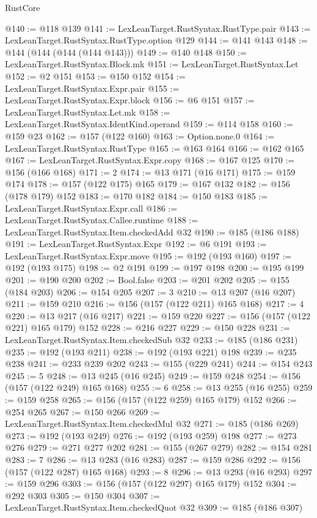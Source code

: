 \begin{lexlean}{RustCore}
\begin{coremodule}
{\begin{coremodule}
{{{{{@140 := @118 @139
@141 := LexLeanTarget.RustSyntax.RustType.pair
@143 := LexLeanTarget.RustSyntax.RustType.option @129
@144 := @141 @143
@148 := @144 (@144 (@144 (@144 @143)))
@149 := @140 @148
@150 := LexLeanTarget.RustSyntax.Block.mk
@151 := LexLeanTarget.RustSyntax.Let
@152 := @2 @151
@153 := @150 @152
@154 := LexLeanTarget.RustSyntax.Expr.pair
@155 := LexLeanTarget.RustSyntax.Expr.block
@156 := @6 @151
@157 := LexLeanTarget.RustSyntax.Let.mk
@158 := LexLeanTarget.RustSyntax.IdentKind.operand
@159 := @114 @158
@160 := @159 @23
@162 := @157 (@122 @160)
@163 := Option.none.{0}
@164 := LexLeanTarget.RustSyntax.RustType
@165 := @163 @164
@166 := @162 @165
@167 := LexLeanTarget.RustSyntax.Expr.copy
@168 := @167 @125
@170 := @156 (@166 @168)
@171 := 2
@174 := @13 @171 (@16 @171)
@175 := @159 @174
@178 := @157 (@122 @175) @165
@179 := @167 @132
@182 := @156 (@178 @179) @152
@183 := @170 @182
@184 := @150 @183
@185 := LexLeanTarget.RustSyntax.Expr.call
@186 := LexLeanTarget.RustSyntax.Callee.runtime
@188 := LexLeanTarget.RustSyntax.Item.checkedAdd @32
@190 := @185 (@186 @188)
@191 := LexLeanTarget.RustSyntax.Expr
@192 := @6 @191
@193 := LexLeanTarget.RustSyntax.Expr.move
@195 := @192 (@193 @160)
@197 := @192 (@193 @175)
@198 := @2 @191
@199 := @197 @198
@200 := @195 @199
@201 := @190 @200
@202 := Bool.false
@203 := @201 @202
@205 := @155 (@184 @203)
@206 := @154 @205
@207 := 3
@210 := @13 @207 (@16 @207)
@211 := @159 @210
@216 := @156 (@157 (@122 @211) @165 @168)
@217 := 4
@220 := @13 @217 (@16 @217)
@221 := @159 @220
@227 := @156 (@157 (@122 @221) @165 @179) @152
@228 := @216 @227
@229 := @150 @228
@231 := LexLeanTarget.RustSyntax.Item.checkedSub @32
@233 := @185 (@186 @231)
@235 := @192 (@193 @211)
@238 := @192 (@193 @221) @198
@239 := @235 @238
@241 := @233 @239 @202
@243 := @155 (@229 @241)
@244 := @154 @243
@245 := 5
@248 := @13 @245 (@16 @245)
@249 := @159 @248
@254 := @156 (@157 (@122 @249) @165 @168)
@255 := 6
@258 := @13 @255 (@16 @255)
@259 := @159 @258
@265 := @156 (@157 (@122 @259) @165 @179) @152
@266 := @254 @265
@267 := @150 @266
@269 := LexLeanTarget.RustSyntax.Item.checkedMul @32
@271 := @185 (@186 @269)
@273 := @192 (@193 @249)
@276 := @192 (@193 @259) @198
@277 := @273 @276
@279 := @271 @277 @202
@281 := @155 (@267 @279)
@282 := @154 @281
@283 := 7
@286 := @13 @283 (@16 @283)
@287 := @159 @286
@292 := @156 (@157 (@122 @287) @165 @168)
@293 := 8
@296 := @13 @293 (@16 @293)
@297 := @159 @296
@303 := @156 (@157 (@122 @297) @165 @179) @152
@304 := @292 @303
@305 := @150 @304
@307 := LexLeanTarget.RustSyntax.Item.checkedQuot @32
@309 := @185 (@186 @307)
}}}}}
\end{coremodule}}
\end{coremodule}
\end{lexlean}
